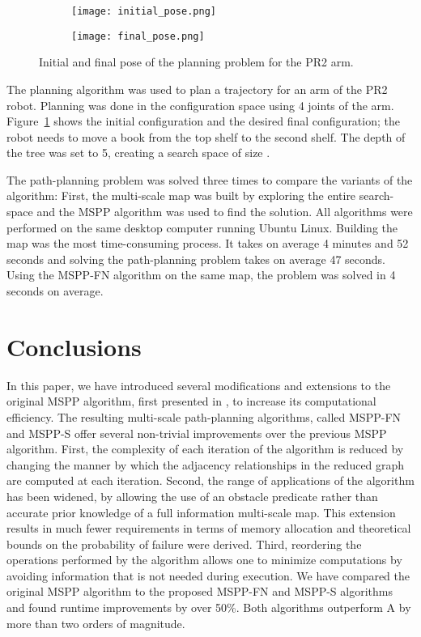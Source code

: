 \documentclass[letterpaper, 10 pt, conference]{ieeeconf}
\theoremstyle{definition}
\begin{document}
\begin{figure}[ht]
\centering
\begin{subfigure}{0.45\linewidth}
\texttt{[image: initial\_pose.png]}
\end{subfigure}\hspace*{2ex}
\begin{subfigure}{0.45\linewidth}
\texttt{[image: final\_pose.png]}
\end{subfigure}
\caption{Initial and final pose of the planning problem for the PR2 arm.}
\label{pr2}
\end{figure}

The planning algorithm was used to plan a trajectory for an arm of the PR2 robot. Planning was done in the configuration space using 4 joints of the arm. Figure~\ref{pr2} shows the initial configuration and the desired final configuration; the robot needs to move a book from the top shelf to the second shelf. The depth of the tree was set to 5, creating a search space of size .

The path-planning problem was solved three times to compare the variants of the algorithm: First, the multi-scale map was built by exploring the entire search-space and the MSPP algorithm was used to find the solution.
All algorithms were performed on the same desktop computer running Ubuntu Linux.
Building the map was the most time-consuming process. 
It takes on average 4 minutes and 52 seconds and solving the path-planning problem takes on average 47 seconds.
Using the MSPP-FN algorithm on the same map, the problem was solved in 4 seconds on average.


\section{Conclusions}

In this paper, we have introduced several modifications and extensions to the original MSPP algorithm, first presented in \cite{hauer2015multi}, to increase its computational efficiency.
The resulting multi-scale path-planning algorithms, called MSPP-FN and MSPP-S offer several non-trivial improvements over the previous MSPP algorithm.
First, the complexity of each iteration of the algorithm is reduced by changing the manner by which the adjacency relationships in the reduced graph are computed at each iteration.
Second, the range of applications of the algorithm has been widened,
by allowing the use of an obstacle predicate rather than accurate prior knowledge of a full information multi-scale map.
This extension results in much fewer requirements in terms of memory allocation and theoretical bounds on the probability of failure were derived.
Third, reordering the operations performed by the algorithm allows one to minimize computations by avoiding
information that is not needed during execution.
We have compared the original MSPP algorithm to the proposed MSPP-FN and MSPP-S algorithms and found runtime improvements by over 50\%.
Both algorithms outperform A by more than two orders of magnitude.




\end{document}
